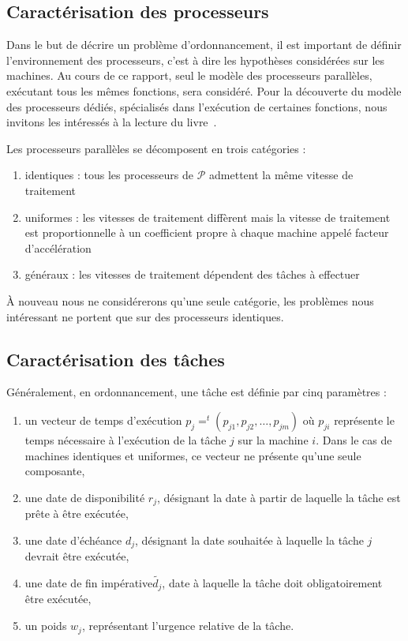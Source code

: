 \subsection{Caractérisation des processeurs}

Dans le but de décrire un problème d'ordonnancement, il est important de définir l'environnement des
processeurs, c'est à dire les hypothèses considérées sur les machines. Au cours de ce rapport, seul
le modèle des processeurs parallèles, exécutant tous les mêmes fonctions, sera considéré. Pour la
découverte du modèle des processeurs dédiés, spécialisés dans l'exécution de certaines fonctions,
nous invitons les intéressés à la lecture du livre~\cite{blazewicz_handbook_2007}.

Les processeurs parallèles se décomposent en trois catégories :
\begin{enumerate}
    \item identiques : tous les processeurs de $\mathcal{P}$ admettent la même vitesse de traitement
    \item uniformes : les vitesses de traitement diffèrent mais la vitesse de traitement est
        proportionnelle à un coefficient propre à chaque machine appelé facteur d'accélération
    \item généraux : les vitesses de traitement dépendent des tâches à effectuer
\end{enumerate}

À nouveau nous ne considérerons qu'une seule catégorie, les problèmes nous intéressant ne portent
que sur des processeurs identiques.

\subsection{Caractérisation des tâches}

Généralement, en ordonnancement, une tâche est définie par cinq paramètres :
\begin{enumerate}
    \item un vecteur de temps d'exécution $p_j = ^t(p_{j1}, p_{j2}, \dots, p_{jm})$ où $p_{ji}$
        représente le temps nécessaire à l'exécution de la tâche $j$ sur la machine $i$. Dans le cas
        de machines identiques et uniformes, ce vecteur ne présente qu'une seule composante,
    \item une date de disponibilité $r_j$, désignant la date à partir de laquelle la tâche est prête
        à être exécutée,
    \item une date d'échéance $d_j$, désignant la date souhaitée à laquelle la tâche $j$ devrait
        être exécutée,
    \item une date de fin impérative$\widetilde{d_j}$, date à laquelle la tâche doit obligatoirement être exécutée,
    \item un poids $w_j$, représentant l'urgence relative de la tâche.
\end{enumerate}


